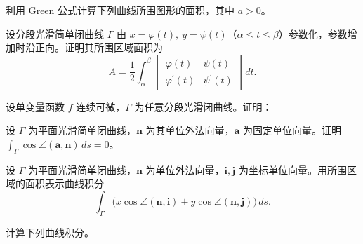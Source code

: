 \noindent\begin{minipage}{\textwidth}
利用 Green 公式计算下列曲线所围图形的面积，其中 $a>0$。
\end{minipage}\par\vfill
\noindent\begin{minipage}{\textwidth}
设分段光滑简单闭曲线 $\Gamma$ 由 $x=\varphi(t),\ y=\psi(t)$（$\alpha\le t\le\beta$）参数化，参数增加时沿正向。证明其所围区域面积为\[A=\frac12\int_\alpha^\beta\begin{vmatrix}\varphi(t)&\psi(t)\\\varphi^{\prime}(t)&\psi^{\prime}(t)\end{vmatrix}dt.\]
\end{minipage}\par\vfill
\newpage
\noindent\begin{minipage}{\textwidth}
设单变量函数 $f$ 连续可微，$\Gamma$ 为任意分段光滑闭曲线。证明：
\end{minipage}\par\vfill
\noindent\begin{minipage}{\textwidth}
设 $\Gamma$ 为平面光滑简单闭曲线，$\mathbf n$ 为其单位外法向量，$\mathbf a$ 为固定单位向量。证明 $\int_\Gamma\cos\angle(\mathbf a,\mathbf n)\,ds=0$。
\end{minipage}\par\vfill
\noindent\begin{minipage}{\textwidth}
设 $\Gamma$ 为平面光滑简单闭曲线，$\mathbf n$ 为单位外法向量，$\mathbf i,\mathbf j$ 为坐标单位向量。用所围区域的面积表示曲线积分\[\int_\Gamma\bigl(x\cos\angle(\mathbf n,\mathbf i)+y\cos\angle(\mathbf n,\mathbf j)\bigr)\,ds.\]
\end{minipage}\par\vfill
\newpage
\noindent\begin{minipage}{\textwidth}
计算下列曲线积分。
\end{minipage}\par\vfill
